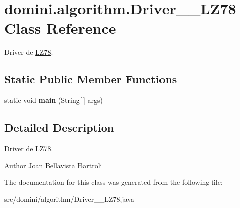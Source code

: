 \hypertarget{classdomini_1_1algorithm_1_1Driver____LZ78}{}\section{domini.\+algorithm.\+Driver\+\_\+\+\_\+\+L\+Z78 Class Reference}
\label{classdomini_1_1algorithm_1_1Driver____LZ78}


Driver de \hyperlink{classdomini_1_1algorithm_1_1LZ78}{L\+Z78}.  


\subsection*{Static Public Member Functions}
\begin{DoxyCompactItemize}
\item 
\mbox{\label{classdomini_1_1algorithm_1_1Driver____LZ78_a3f8db12503ffe92702d5b6670c56e792}} 
static void {\bfseries main} (String\mbox{[}$\,$\mbox{]} args)
\end{DoxyCompactItemize}


\subsection{Detailed Description}
Driver de \hyperlink{classdomini_1_1algorithm_1_1LZ78}{L\+Z78}. 

\begin{DoxyAuthor}{Author}
Joan Bellavista Bartroli 
\end{DoxyAuthor}


The documentation for this class was generated from the following file\+:\begin{DoxyCompactItemize}
\item 
src/domini/algorithm/Driver\+\_\+\+\_\+\+L\+Z78.\+java\end{DoxyCompactItemize}
